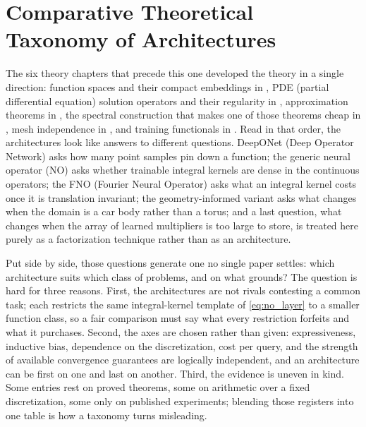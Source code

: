 
\chapter{Comparative Theoretical Taxonomy of Architectures}
\label{ch:part1-comparative-theoretical-taxonomy-of-archit}
\label{sec:taxonomy}

The six theory chapters that precede this one developed the theory in a single direction: function spaces and their compact embeddings in , PDE (partial differential equation) solution operators and their regularity in , approximation theorems in , the spectral construction that makes one of those theorems cheap in , mesh independence in , and training functionals in . Read in that order, the architectures look like answers to different questions. DeepONet (Deep Operator Network)  asks how many point samples pin down a function; the generic neural operator (NO)  asks whether trainable integral kernels are dense in the continuous operators; the FNO (Fourier Neural Operator) asks what an integral kernel costs once it is translation invariant; the geometry-informed variant asks what changes when the domain is a car body rather than a torus; and a last question, what changes when the array of learned multipliers is too large to store, is treated here purely as a factorization technique rather than as an architecture.

Put side by side, those questions generate one no single paper settles: which architecture suits which class of problems, and on what grounds? The question is hard for three reasons. First, the architectures are not rivals contesting a common task; each restricts the same integral-kernel template of \eqref{eq:no_layer} to a smaller function class, so a fair comparison must say what every restriction forfeits and what it purchases. Second, the axes are chosen rather than given: expressiveness, inductive bias, dependence on the discretization, cost per query, and the strength of available convergence guarantees are logically independent, and an architecture can be first on one and last on another. Third, the evidence is uneven in kind. Some entries rest on proved theorems, some on arithmetic over a fixed discretization, some only on published experiments; blending those registers into one table is how a taxonomy turns misleading.

